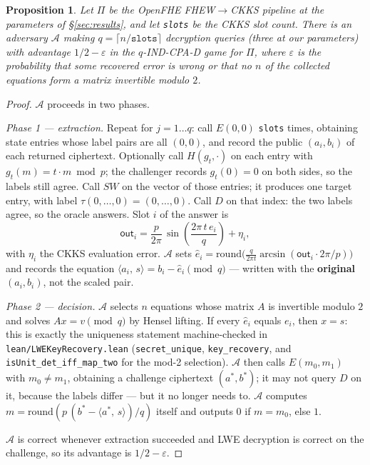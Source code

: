 \documentclass[11pt]{article}
\newtheorem{proposition}{Proposition}
\newcommand{\inner}[2]{\langle #1,\, #2\rangle}
\newcommand{\fto}{\texorpdfstring{FHEW$\to$CKKS}{FHEW-to-CKKS}}
\newcommand{\out}{\mathsf{out}}
\newcommand{\code}[1]{\texttt{#1}}
\begin{document}
\begin{proposition}
Let $\Pi$ be the OpenFHE \fto{} pipeline at the parameters of \S\ref{sec:results}, and let
\code{slots} be the CKKS slot count. There is an adversary $\mathcal{A}$ making
$q = \lceil n/\code{slots}\rceil$ decryption queries (three at our parameters) with advantage
$1/2 - \varepsilon$ in the $q$-IND-CPA-D game for $\Pi$, where $\varepsilon$ is the probability
that some recovered error is wrong or that no $n$ of the collected equations form a matrix
invertible modulo $2$.
\end{proposition}

\begin{proof}
$\mathcal{A}$ proceeds in two phases.

\emph{Phase 1 --- extraction.} Repeat for $j = 1 \dots q$: call $E(0, 0)$ \code{slots} times,
obtaining state entries whose label pairs are all $(0, 0)$, and record the public $(a_i, b_i)$ of
each returned ciphertext. Optionally call $H(g_t, \cdot)$ on each entry with
$g_t(m) = t\cdot m \bmod p$; the challenger records $g_t(0) = 0$ on both sides, so the labels still
agree. Call $\mathit{SW}$ on the vector of those entries; it produces one target entry, with label
$\tau(0, \dots, 0) = (0, \dots, 0)$. Call $D$ on that index: the two labels agree, so the oracle
answers. Slot $i$ of the answer is
\[
  \out_i = \frac{p}{2\pi}\,\sin\!\left(\frac{2\pi\,t\,e_i}{q}\right) + \eta_i,
\]
with $\eta_i$ the CKKS evaluation error. $\mathcal{A}$ sets
$\hat{e}_i = \mathrm{round}\!\big(\tfrac{q}{2\pi t}\arcsin(\out_i \cdot 2\pi/p)\big)$ and records the
equation $\inner{a_i}{s} = b_i - \hat{e}_i \pmod q$ --- written with the \textbf{original}
$(a_i, b_i)$, not the scaled pair.

\emph{Phase 2 --- decision.} $\mathcal{A}$ selects $n$ equations whose matrix $A$ is invertible
modulo $2$ and solves $A x = v \pmod q$ by Hensel lifting. If every $\hat{e}_i$ equals $e_i$, then
$x = s$: this is exactly the uniqueness statement machine-checked in
\code{lean/LWEKeyRecovery.lean} (\code{secret\_unique}, \code{key\_recovery}, and
\code{isUnit\_det\_iff\_map\_two} for the mod-2 selection). $\mathcal{A}$ then calls $E(m_0, m_1)$
with $m_0 \neq m_1$, obtaining a challenge ciphertext $(a^*, b^*)$; it may not query $D$ on it,
because the labels differ --- but it no longer needs to. $\mathcal{A}$ computes
$m = \mathrm{round}(p\,(b^* - \inner{a^*}{s})/q)$ itself and outputs $0$ if $m = m_0$, else $1$.

$\mathcal{A}$ is correct whenever extraction succeeded and LWE decryption is correct on the
challenge, so its advantage is $1/2 - \varepsilon$.
\end{proof}
\end{document}
